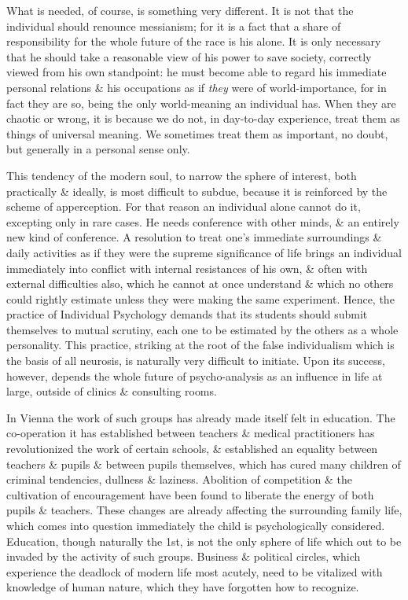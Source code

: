 \documentclass{article}
\begin{document}
What is needed, of course, is something very different. It is not that the individual should renounce messianism; for it is a fact that a share of responsibility for the whole future of the race is his alone. It is only necessary that he should take a reasonable view of his power to save society, correctly viewed from his own standpoint: he must become able to regard his immediate personal relations \& his occupations as if \textit{they} were of world-importance, for in fact they are so, being the only world-meaning an individual has. When they are chaotic or wrong, it is because we do not, in day-to-day experience, treat them as things of universal meaning. We sometimes treat them as important, no doubt, but generally in a personal sense only.

This tendency of the modern soul, to narrow the sphere of interest, both practically \& ideally, is most difficult to subdue, because it is reinforced by the scheme of apperception. For that reason an individual alone cannot do it, excepting only in rare cases. He needs conference with other minds, \& an entirely new kind of conference. A resolution to treat one's immediate surroundings \& daily activities as if they were the supreme significance of life brings an individual immediately into conflict with internal resistances of his own, \& often with external difficulties also, which he cannot at once understand \& which no others could rightly estimate unless they were making the same experiment. Hence, the practice of Individual Psychology demands that its students should submit themselves to mutual scrutiny, each one to be estimated by the others as a whole personality. This practice, striking at the root of the false individualism which is the basis of all neurosis, is naturally very difficult to initiate. Upon its success, however, depends the whole future of psycho-analysis as an influence in life at large, outside of clinics \& consulting rooms.

In Vienna the work of such groups has already made itself felt in education. The co-operation it has established between teachers \& medical practitioners has revolutionized the work of certain schools, \& established an equality between teachers \& pupils \& between pupils themselves, which has cured many children of criminal tendencies, dullness \& laziness. Abolition of competition \& the cultivation of encouragement have been found to liberate the energy of both pupils \& teachers. These changes are already affecting the surrounding family life, which comes into question immediately the child is psychologically considered. Education, though naturally the 1st, is not the only sphere of life which out to be invaded by the activity of such groups. Business \& political circles, which experience the deadlock of modern life most acutely, need to be vitalized with knowledge of human nature, which they have forgotten how to recognize.
\end{document}
